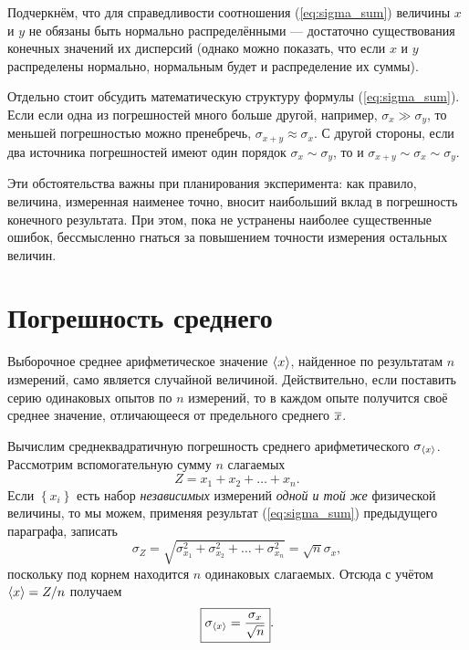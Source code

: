 Подчеркнём, что для справедливости соотношения (\ref{eq:sigma_sum})
величины $x$ и $y$ не обязаны быть нормально распределёнными ---
достаточно существования конечных значений их дисперсий (однако можно
показать, что если $x$ и $y$ распределены нормально, нормальным
будет и распределение их суммы).


Отдельно стоит обсудить математическую структуру формулы (\ref{eq:sigma_sum}).
Если если одна из погрешностей много больше другой, например,
$\sigma_{x}\gg\sigma_{y}$,
то меньшей погрешностью можно пренебречь, $\sigma_{x+y}\approx\sigma_{x}$.
С другой стороны, если два источника погрешностей имеют один порядок
$\sigma_{x}\sim\sigma_{y}$, то и $\sigma_{x+y}\sim\sigma_{x}\sim\sigma_{y}$.

Эти обстоятельства важны при планирования эксперимента: как правило,
величина, измеренная наименее точно, вносит наибольший вклад в погрешность
конечного результата. При этом, пока не устранены наиболее существенные
ошибок, бессмысленно гнаться за повышением точности измерения остальных
величин.


\section{Погрешность среднего}\label{sec:average}

Выборочное среднее арифметическое значение $\left<x\right>$, найденное
по результатам $n$ измерений, само является случайной величиной.
Действительно, если поставить серию одинаковых опытов по $n$ измерений,
то в каждом опыте получится своё среднее значение, отличающееся от
предельного среднего $\overline{x}$.

Вычислим среднеквадратичную погрешность среднего арифметического
$\sigma_{\left<x\right>}$.
Рассмотрим вспомогательную сумму $n$ слагаемых
\[
    Z=x_{1}+x_{2}+\ldots+x_{n}.
\]
Если $\left\{ x_{i}\right\} $ есть набор \emph{независимых} измерений
\emph{одной и той же} физической величины, то мы можем, применяя результат
(\ref{eq:sigma_sum}) предыдущего параграфа, записать
\[
    \sigma_{Z}=\sqrt{\sigma_{x_{1}}^{2}+\sigma_{x_{2}}^{2}+\ldots+\sigma_{x_{n}}^{2}
    }=\sqrt{n}\sigma_{x},
\]
поскольку под корнем находится $n$ одинаковых слагаемых. Отсюда с
учётом $\left<x\right>=Z/n$ получаем
\begin{equation}
\boxed{{\sigma_{\left<x\right>}=\frac{\sigma_{x}}{\sqrt{n}}}}.\label{eq:sigma_avg}
\end{equation}

